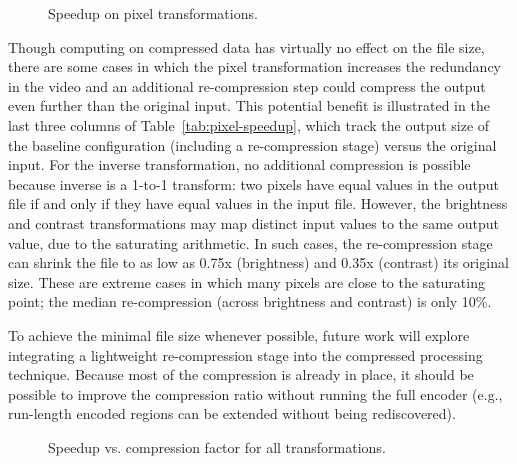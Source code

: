 \begin{figure}[t]
\vspace{-1\baselineskip}
\caption{Speedup on pixel transformations.
\protect\label{fig:pixel-speedup}}
\end{figure}

Though computing on compressed data has virtually no effect on the
file size, there are some cases in which the pixel transformation
increases the redundancy in the video and an additional re-compression
step could compress the output even further than the original input.
This potential benefit is illustrated in the last three columns of
Table~\ref{tab:pixel-speedup}, which track the output size of the
baseline configuration (including a re-compression stage) versus the
original input.  For the inverse transformation, no additional
compression is possible because inverse is a 1-to-1 transform: two
pixels have equal values in the output file if and only if they have
equal values in the input file.  However, the brightness and contrast
transformations may map distinct input values to the same output
value, due to the saturating arithmetic.  In such cases, the
re-compression stage can shrink the file to as low as 0.75x
(brightness) and 0.35x (contrast) its original size.  These are
extreme cases in which many pixels are close to the saturating point;
the median re-compression (across brightness and contrast) is only
10\%.

To achieve the minimal file size whenever possible, future work will
explore integrating a lightweight re-compression stage into the
compressed processing technique.  Because most of the compression is
already in place, it should be possible to improve the compression
ratio without running the full encoder (e.g., run-length encoded
regions can be extended without being rediscovered).  

%

\begin{figure}[t]
\vspace{-1\baselineskip}\vspace{-2.5pt}
\hspace{-0.1in}
\caption{Speedup vs. compression factor for all transformations.
\protect\label{fig:speedup-scatter}}
\end{figure}

